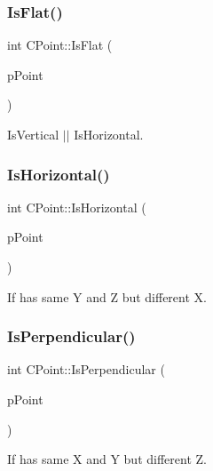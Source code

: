 \subsubsection{\texorpdfstring{IsFlat()}{IsFlat()}}
{\footnotesize\ttfamily int C\+Point\+::\+Is\+Flat (\begin{DoxyParamCaption}\item[{\mbox{\hyperlink{classCPoint}{C\+Point}} $\ast$}]{p\+Point }\end{DoxyParamCaption})}



Is\+Vertical $\vert$$\vert$ Is\+Horizontal. 

\mbox{\label{classCPoint_a44e549d9e95bb88d0abbe614ab5f1435}} 
\subsubsection{\texorpdfstring{IsHorizontal()}{IsHorizontal()}}
{\footnotesize\ttfamily int C\+Point\+::\+Is\+Horizontal (\begin{DoxyParamCaption}\item[{\mbox{\hyperlink{classCPoint}{C\+Point}} $\ast$}]{p\+Point }\end{DoxyParamCaption})}



If has same Y and Z but different X. 

\mbox{\label{classCPoint_a9ae0796ca1d732df8bf718c07e998e41}} 
\subsubsection{\texorpdfstring{IsPerpendicular()}{IsPerpendicular()}}
{\footnotesize\ttfamily int C\+Point\+::\+Is\+Perpendicular (\begin{DoxyParamCaption}\item[{\mbox{\hyperlink{classCPoint}{C\+Point}} $\ast$}]{p\+Point }\end{DoxyParamCaption})}



If has same X and Y but different Z. 

\mbox{\label{classCPoint_a280126da62c6a79238c2511639d58786}} 
